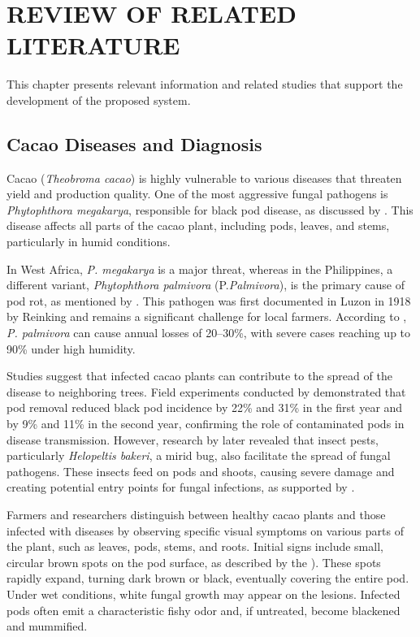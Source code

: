 \chapter{REVIEW OF RELATED LITERATURE}
This chapter presents relevant information and related studies that support the development of the proposed system.

\section{Cacao Diseases and Diagnosis}
Cacao (\textit{Theobroma cacao}) is highly vulnerable to various diseases that threaten yield and production quality. One of the most aggressive fungal pathogens is \textit{Phytophthora megakarya}, responsible for black pod disease, as discussed by \cite{Andrews1997}. This disease affects all parts of the cacao plant, including pods, leaves, and stems, particularly in humid conditions.

In West Africa, \textit{P. megakarya} is a major threat, whereas in the Philippines, a different variant, \textit{Phytophthora palmivora} (P.\textit{Palmivora}), is the primary cause of pod rot, as mentioned by \cite{Solpot2020}. This pathogen was first documented in Luzon in 1918 by Reinking and remains a significant challenge for local farmers. According to \cite{AceboGuerrero2012}, \textit{P. palmivora} can cause annual losses of 20–30\%, with severe cases reaching up to 90\% under high humidity.

Studies suggest that infected cacao plants can contribute to the spread of the disease to neighboring trees. Field experiments conducted by \cite{Ndoumbe2004} demonstrated that pod removal reduced black pod incidence by 22\% and 31\% in the first year and by 9\% and 11\% in the second year, confirming the role of contaminated pods in disease transmission. However, research by \cite{Babin2018} later revealed that insect pests, particularly \textit{Helopeltis bakeri}, a mirid bug, also facilitate the spread of fungal pathogens. These insects feed on pods and shoots, causing severe damage and creating potential entry points for fungal infections, as supported by \cite{Guest2007}.

Farmers and researchers distinguish between healthy cacao plants and those infected with diseases by observing specific visual symptoms on various parts of the plant, such as leaves, pods, stems, and roots. Initial signs include small, circular brown spots on the pod surface, as described by the \cite{MinistryAgri}). These spots rapidly expand, turning dark brown or black, eventually covering the entire pod. Under wet conditions, white fungal growth may appear on the lesions. Infected pods often emit a characteristic fishy odor and, if untreated, become blackened and mummified.

